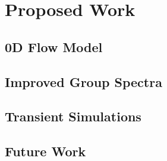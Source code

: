 \chapter{Proposed Work}
\label{sec:proposed-work}

\section{0D Flow Model}
\label{sec:proposed-0d-flow}

\section{Improved Group Spectra}

\section{Transient Simulations}

\section{Future Work}
\label{sec:future-work}



